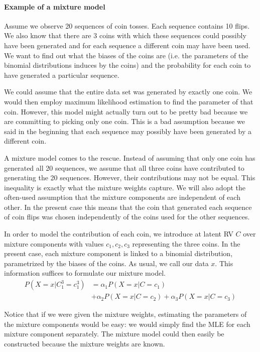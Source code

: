 \paragraph{Example of a mixture model} Assume we observe 20 sequences of coin tosses. Each sequence
contains 10 flips. We also know that there are 3 coins with which these sequences could possibly have been
generated and for each sequence a different coin may have been used. We want to find out what the biases
of the coins are (i.e. the parameters of the binomial distributions induces by the coins) and the probability
for each coin to have generated a particular sequence.
 
We could assume that the entire data set was generated by exactly one coin. We would then employ maximum likelihood estimation 
to find the parameter of that coin. However, this model might actually turn out to be
pretty bad because we are committing to picking only one coin. This is a bad assumption because we said in the beginning that
each sequence may possibly have been generated by a different coin. 

A mixture model comes to the rescue. Instead of assuming that only one coin has generated all 20 sequences,
we assume that all three coins have contributed to generating the 20 sequences. However, their contributions
may not be equal. This inequality is exactly what the mixture weights capture. We will also adopt the often-used assumption
that the mixture components are independent of each other. In the present case this means that the coin that generated each
sequence of coin flips was chosen independently of the coins used for the other sequences.

In order to model the contribution of each coin, we introduce at latent RV $ C $ over mixture components with values $ c_{1}, c_{2}, c_{3} $ representing the three coins.
In the present case, each mixture component is linked to a binomial distribution, parametrized by the biases of
the coins. As usual, we call our data $ x $. This information suffices to formulate our mixture model.
\begin{align} 
P(X=x|C_{1}^{3}=c_{1}^{3}) 
&= \alpha_{1}P(X=x|C=c_{1}) \label{eq:mixtureExample} \\
&+ \alpha_{2}P(X=x|C=c_{2}) + \alpha_{3}P(X=x|C=c_{3}) \nonumber
\end{align}

Notice that if we were given the mixture weights, estimating
the parameters of the mixture components would be easy: we would simply find the MLE for each mixture component separately. The mixture
model could then easily be constructed because the mixture weights are known. 

